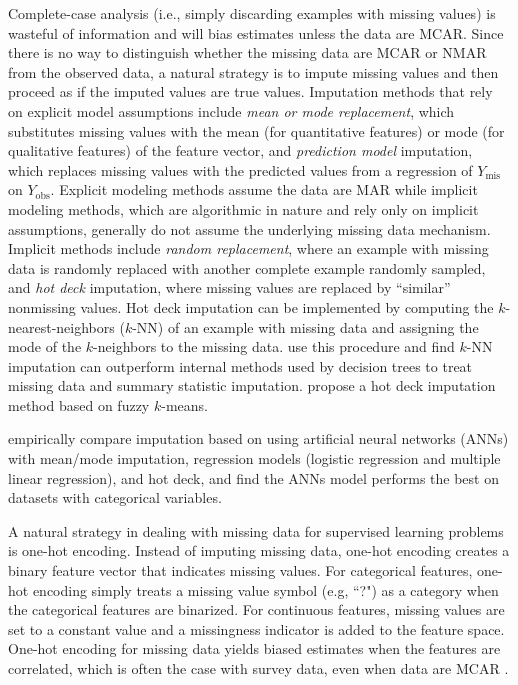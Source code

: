 \documentclass[10pt]{book}
\theoremstyle{definition}
\begin{document}
Complete-case analysis (i.e., simply discarding examples with missing values) is wasteful of information and will bias estimates unless the data are MCAR. Since there is no way to distinguish whether the missing data are MCAR or NMAR from the observed data, a natural strategy is to impute missing values and then proceed as if the imputed values are true values. Imputation methods that rely on explicit model assumptions include \emph{mean or mode replacement}, which substitutes missing values with the mean (for quantitative features) or mode (for qualitative features) of the feature vector, and \emph{prediction model} imputation, which replaces missing values with the predicted values from a regression of $Y_{\mathrm{mis}}$ on $Y_{\mathrm{obs}}$. Explicit modeling methods assume the data are MAR while implicit modeling methods, which are algorithmic in nature and rely only on implicit assumptions, generally do not assume the underlying missing data mechanism. Implicit methods include \emph{random replacement}, where an example with missing data is randomly replaced with another complete example randomly sampled, and \emph{hot deck} imputation, where missing values are replaced by ``similar'' nonmissing values. Hot deck imputation can be implemented by computing the $k$-nearest-neighbors ($k$-NN) of an example with missing data and assigning the mode of the $k$-neighbors to the missing data. \citep{batista2003analysis} use this procedure and find $k$-NN imputation can outperform internal methods used by decision trees to treat missing data and summary statistic imputation. \citep{li2004} propose a hot deck imputation method based on fuzzy $k$-means. 

\citep{silva2011} empirically compare imputation based on using artificial neural networks (ANNs) with mean/mode  imputation, regression models (logistic regression and multiple linear regression), and hot deck, and find the ANNs model performs the best on datasets with categorical variables. 


A natural strategy in dealing with missing data for supervised learning problems is one-hot encoding. Instead of imputing missing data, one-hot encoding creates a binary feature vector that indicates missing values. For categorical features, one-hot encoding simply treats a missing value symbol (e.g, ``?") as a category when the categorical features are binarized. For continuous features, missing values are set to a constant value and a missingness indicator is added to the feature space. One-hot encoding for missing data yields biased estimates when the features are correlated, which is often the case with survey data, even when data are MCAR \citep{jones1996}. 
\end{document}
